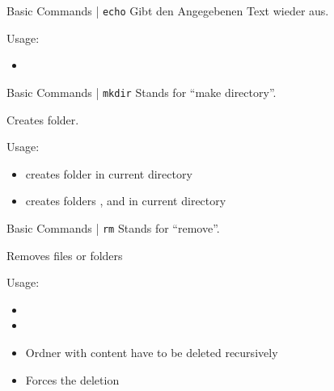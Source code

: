 \documentclass{setbeamer}
\begin{document}
\begin{frame}{Basic Commands | \texttt{echo}}
    Gibt den Angegebenen Text wieder aus.

    \vspace{0.3cm}

    Usage:
    \begin{itemize}
        \item {}
    \end{itemize}
\end{frame}

\begin{frame}{Basic Commands | \texttt{mkdir}}
    Stands for ``make directory''.

    \vspace{0.3cm}

    Creates folder.

    \vspace{0.3cm}

    Usage:
    \begin{itemize}
        \item {}\textemdash creates folder  in current directory
        \item {}\textemdash creates folders ,  and  in current directory
    \end{itemize}
\end{frame}

\begin{frame}{Basic Commands | \texttt{rm}}
    Stands for ``remove''.

    \vspace{0.3cm}

    Removes files or folders

    \vspace{0.3cm}

    Usage:
    \begin{itemize}
        \item {}
        \item {}
        \item {}\textemdash Ordner with content have to be deleted recursively
        \item {}\textemdash Forces the deletion
    \end{itemize}
\end{frame}
\end{document}
